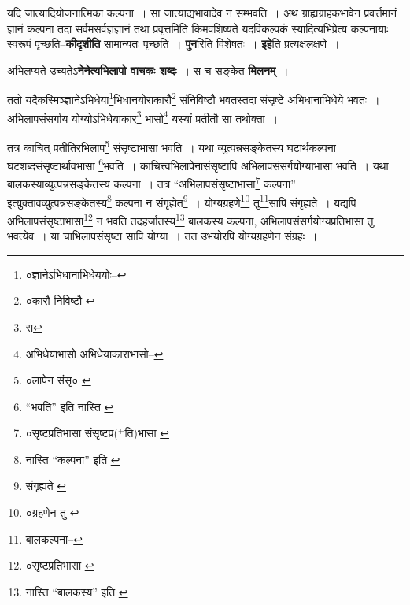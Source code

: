 \documentclass[article,12pt,a4paper]{memoir}
\newcommand{\add}[1]{($^{+}$#1)}
\begin{document}
	  \pstart यदि जात्यादियोजनात्मिका कल्पना । सा जात्याद्यभावादेव न सम्भवति । अथ ग्राह्यग्राहकभावेन प्रवर्त्तमानं ज्ञानं कल्पना तदा सर्वमसर्वज्ञज्ञानं तथा प्रवृत्तमिति किमवशिष्यते यदविकल्पकं स्यादित्यभिप्रेत्य कल्पनायाः स्वरूपं पृच्छति--\textbf{कीदृशीति} सामान्यतः पृच्छति । \textbf{पुन}रिति विशेषतः । \textbf{इहे}ति प्रत्यक्षलक्षणे ।
	\pend
      

	  \pstart अभिलप्यते उच्यतेऽ\textbf{नेनेत्यभिलापो वाचकः शब्दः} । स च सङ्केत-\textbf{मिलनम्} ।
	\pend
      \leavevmode{}
	  \bigskip
	  \begingroup
	

	  \pstart ततो यदैकस्मिञ्ज्ञानेऽभिधेया\footnote{०ज्ञानेऽभिधानाभिधेययोः--\cite{dp-msB}}भिधानयोराकारौ\footnote{०कारौ निविष्टौ \cite{dp-msB}} संनिविष्टौ भवतस्तदा संसृष्टे अभिधानाभिधेये भवतः । अभिलापसंसर्गाय योग्योऽभिधेयाकार\footnote{रा} भासो\footnote{अभिधेयाभासो \cite{dp-msA} \cite{dp-edP} \cite{dp-edH} \cite{dp-edE} अभिधेयाकाराभासो--\cite{dp-edN}} यस्यां प्रतीतौ सा तथोक्ता ।
	\pend
       

	  \pstart तत्र काचित् प्रतीतिरभिलाप\footnote{०लापेन संसृ० \cite{dp-msA} \cite{dp-edP} \cite{dp-edH} \cite{dp-edE} \cite{dp-edN}} संसृष्टाभासा भवति । यथा व्युत्पन्नसङ्केतस्य घटार्थकल्पना घटशब्दसंसृष्टार्थावभासा \footnote{“भवति” इति नास्ति \cite{dp-msB} \cite{dp-msD}}भवति । काचित्त्वभिलापेनासंसृष्टापि अभिलापसंसर्गयोग्याभासा भवति । यथा बालकस्याव्युत्पन्नसङ्केतस्य कल्पना । तत्र “अभिलापसंसृष्टाभासा\footnote{०सृष्टप्रतिभासा \cite{dp-msD} संसृष्टप्र\add{ति}भासा \cite{dp-msB}} कल्पना” इत्युक्तावव्युत्पन्नसङ्केतस्य\footnote{नास्ति “कल्पना” इति \cite{dp-msA} \cite{dp-msB} \cite{dp-edP} \cite{dp-edH} \cite{dp-edE} \cite{dp-edN}} कल्पना न संगृह्येत\footnote{संगृह्यते \cite{dp-msC}} । योग्यग्रहणे\footnote{०ग्रहणेन तु \cite{dp-msC}} तु\footnote{बालकल्पना--\cite{dp-msD-n}}सापि संगृह्यते । यद्यपि अभिलापसंसृष्टाभासा\footnote{०सृष्टप्रतिभासा \cite{dp-msC} \cite{dp-msA}} न भवति तदहर्जातस्य\footnote{नास्ति “बालकस्य” इति \cite{dp-msA} \cite{dp-edP} \cite{dp-edE}} बालकस्य कल्पना, अभिलापसंसर्गयोग्यप्रतिभासा तु भवत्येव । या चाभिलापसंसृष्टा सापि योग्या । तत उभयोरपि योग्यग्रहणेन संग्रहः ।
	\pend
      
	  \endgroup
	
\end{document}
